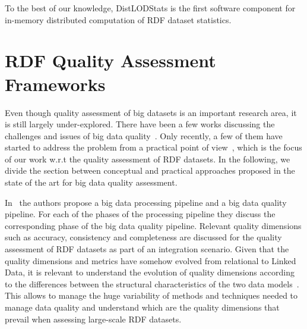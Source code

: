 To the best of our knowledge, DistLODStats is the first software component for in-memory distributed computation of RDF dataset statistics. 

\section{RDF Quality Assessment Frameworks}
Even though quality assessment of big datasets is an important research area, it is still largely under-explored. 
There have been a few works discussing the challenges and issues of big data quality~\cite{becker2015big,RaoG015,cai2015challenges}. 
Only recently, a few of them have started to address the problem from a practical point of view~\cite{debattista2016luzzu}, which is the focus of our work w.r.t the quality assessment of RDF datasets. %
In the following, we divide the section between conceptual and practical approaches proposed in the state of the art for big data quality assessment.

In~\cite{CatarciSCD17} the authors propose a big data processing pipeline and a big data quality pipeline. 
For each of the phases of the processing pipeline they discuss the corresponding phase of the big data quality pipeline.
Relevant quality dimensions such as accuracy, consistency and completeness are discussed for the quality assessment of RDF datasets as part of an integration scenario.
Given that the quality dimensions and metrics have somehow evolved from relational to Linked Data,
it is relevant to understand the evolution of quality dimensions according to the differences between the structural characteristics of the two data models~\cite{BatiniRSV15}. 
This allows to manage the huge variability of methods and techniques needed to manage data quality and understand which are the quality dimensions that prevail when assessing large-scale RDF datasets.

